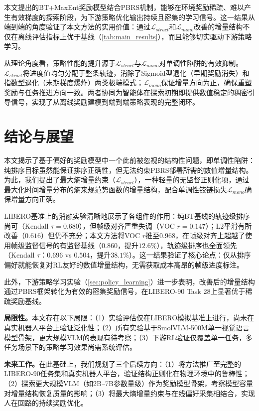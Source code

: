 本文提出的BT+MaxEnt奖励模型结合PBRS机制，能够在环境奖励稀疏、难以产生有效梯度的探索阶段，为下游策略优化输出持续且密集的学习信号。这一结果从端到端的角度验证了本文方法的实用价值：通过$\mathcal{L}_{struct}$和$\mathcal{L}_{mono}$改善的增量结构不仅在离线评估指标上优于基线（\cref{tab:main_results}），而且能够切实驱动下游策略学习。

从理论角度看，策略性能的提升源于$\mathcal{L}_{struct}$与$\mathcal{L}_{mono}$对单调性陷阱的有效抑制。$\mathcal{L}_{struct}$将进度值均匀分配于整条轨迹，消除了Sigmoid型退化（早期奖励消失）和指数型退化（末期梯度爆炸）两类极端模式；$\mathcal{L}_{mono}$保证增量方向为正，确保重塑奖励与任务推进方向一致。两者协同为智能体在探索初期即提供数值稳定的稠密引导信号，实现了从离线奖励建模到端到端策略表现的完整闭环。


\clearpage


\section{结论与展望}
\label{sec:conclusion}

本文揭示了基于偏好的奖励模型中一个此前被忽视的结构性问题，即单调性陷阱：纯排序目标虽然能保证排序正确性，但无法约束PBRS部署所需的数值增量结构。为此，我们提出了最大熵增量约束（$\mathcal{L}_{struct}$），一种轻量的无监督正则化项，通过最大化时间增量分布的熵来规范势函数的增量结构，配合单调性铰链损失$\mathcal{L}_{mono}$确保增量方向正确。

LIBERO基准上的消融实验清晰地展示了各组件的作用：纯BT基线的轨迹级排序尚可（Kendall $\tau = 0.680$），但帧级对齐严重失调（VOC $r = 0.147$）；L2平滑有所改善（$0.616$）但仍不充分；本文方法将VOC $r$推至$0.968$，在帧级对齐上超越了使用帧级监督信号的有监督基线（$0.860$，提升$12.6\%$），轨迹级排序也全面领先（Kendall $\tau$：$0.696$ vs $0.504$，提升$38.1\%$）。这一结果验证了核心论点：仅从排序偏好就能恢复对RL友好的数值增量结构，无需获取成本高昂的帧级进度标注。

此外，下游策略学习实验（\cref{sec:policy_learning}）进一步表明，改善后的增量结构通过PBRS框架转化为有效的密集奖励信号，在LIBERO-90 Task 28上显著优于稀疏奖励基线。

\textbf{局限性。}本文存在以下局限：（1）实验评估仅在LIBERO模拟基准上进行，尚未在真实机器人平台上验证泛化性；（2）所有实验基于SmolVLM-500M单一视觉语言模型骨架，更大规模VLM的表现有待考察；（3）下游RL验证仅覆盖单一任务，多任务场景下的策略学习效果尚需系统评估。

\textbf{未来工作。}在此基础上，我们规划了三个后续方向：（1）将方法推广至完整的LIBERO-90任务集和真实机器人平台，验证结构正则化在物理环境中的鲁棒性；（2）探索更大规模VLM（如2B--7B参数量级）作为奖励模型骨架，考察模型容量对增量结构恢复质量的影响；（3）将最大熵增量约束与在线偏好采集相结合，实现人在回路的持续奖励优化。



